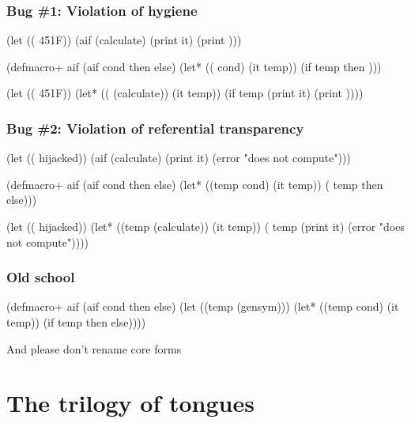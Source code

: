 \documentclass[hyperref={bookmarks=false}]{beamer}
\begin{document}
\begin{frame}[fragile]
\frametitle{Bug \#1: Violation of hygiene}
\begin{semiverbatim}
(let ((\text{\color{blue}{temp}} 451{\textdegree}F))
  (aif (calculate)
    (print it)
    (print \text{\color{blue}{temp}})))

(defmacro+ aif
  (aif cond then else)
  (let* ((\text{\color{red}{temp}} cond)
         (it temp))
    (if temp then \text{\color{red}{else}})))

(let ((\text{\color{blue}{temp}} 451{\textdegree}F))
  (let* ((\text{\color{red}{temp}} (calculate))
         (it temp))
    (if temp
      (print it)
      (print \text{\color{red}{temp}}))))
\end{semiverbatim}
\end{frame}

\begin{frame}[fragile]
\frametitle{Bug \#2: Violation of referential transparency}
\begin{semiverbatim}
(let ((\text{\color{blue}{if}} hijacked))
  (aif (calculate)
    (print it)
    (error "does not compute")))

(defmacro+ aif
  (aif cond then else)
  (let* ((temp cond)
         (it temp))
    (\text{\color{red}{if}} temp then else)))

(let ((\text{\color{blue}{if}} hijacked))
  (let* ((temp (calculate))
         (it temp))
    (\text{\color{blue}{if}} temp
      (print it)
      (error "does not compute"))))
\end{semiverbatim}
\end{frame}

\begin{frame}[fragile]
\frametitle{Old school}
\begin{semiverbatim}
(defmacro+ aif
  (aif cond then else)
  \alert{(let ((temp (gensym)))}
    (let* ((temp cond)
           (it temp))
      (if temp then else))))
\end{semiverbatim}

And please don't rename core forms
\end{frame}

\section{The trilogy of tongues}
\end{document}
